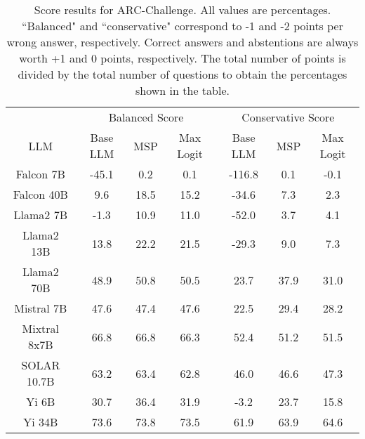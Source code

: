 \begin{table*}
\centering
\begin{tabular}{c|c|c|c|c|c|c}
& \multicolumn{3}{c|}{Balanced Score} & \multicolumn{3}{c}{Conservative Score} \\ 
LLM & Base LLM & MSP & Max Logit & Base LLM & MSP & Max Logit\\ \hline
Falcon 7B & -45.1 & 0.2 & 0.1 & -116.8 & 0.1 & -0.1\\
Falcon 40B & 9.6 & 18.5 & 15.2 & -34.6 & 7.3 & 2.3\\
Llama2 7B & -1.3 & 10.9 & 11.0 & -52.0 & 3.7 & 4.1\\
Llama2 13B & 13.8 & 22.2 & 21.5 & -29.3 & 9.0 & 7.3\\
Llama2 70B & 48.9 & 50.8 & 50.5 & 23.7 & 37.9 & 31.0\\
Mistral 7B & 47.6 & 47.4 & 47.6 & 22.5 & 29.4 & 28.2\\
Mixtral 8x7B & 66.8 & 66.8 & 66.3 & 52.4 & 51.2 & 51.5\\
SOLAR 10.7B & 63.2 & 63.4 & 62.8 & 46.0 & 46.6 & 47.3\\
Yi 6B & 30.7 & 36.4 & 31.9 & -3.2 & 23.7 & 15.8\\
Yi 34B & 73.6 & 73.8 & 73.5 & 61.9 & 63.9 & 64.6\\
\hline
\end{tabular}
\caption{Score results for ARC-Challenge. All values are percentages. ``Balanced" and ``conservative" correspond to -1 and -2 points per wrong answer, respectively. Correct answers and abstentions are always worth +1 and 0 points, respectively. The total number of points is divided by the total number of questions to obtain the percentages shown in the table.}
\label{tab:arc_score}
\end{table*}
